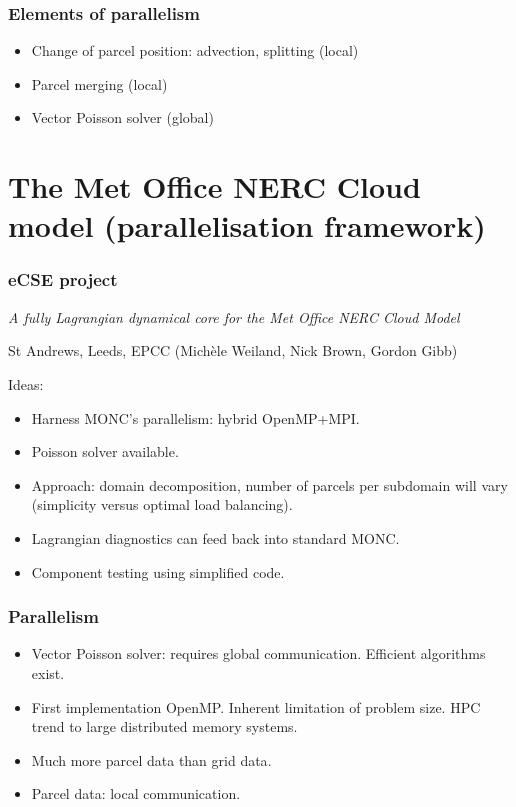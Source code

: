 \documentclass{beamer}
\def\oran#1{\color{orange} #1}
\def\gr#1{\color{dark_green} #1}
\def\re#1{\color{red}   #1}
\def\bl#1{\color{blue}  #1}
\def\pu#1{\color{purple} #1}
\begin{document}
\begin{frame}
\frametitle{Elements of parallelism}

\begin{itemize}
\item Change of parcel position: advection, splitting (local)
\item Parcel merging (local)
\item Vector Poisson solver (global)
\end{itemize}

\end{frame}

\section{The Met Office NERC Cloud model (parallelisation framework)}

\begin{frame}
\frametitle{eCSE project}
\textit{A fully Lagrangian dynamical core for the Met Office NERC Cloud Model}
\vspace{0.2cm}
\begin{center}
St Andrews, Leeds, EPCC (Mich\`ele Weiland, Nick Brown, Gordon Gibb)
\end{center}

\vspace{0.1cm}
Ideas:
\begin{itemize}
\item Harness {\gr MONC's parallelism}: hybrid OpenMP+MPI.
\item Poisson solver available.
\item Approach: {\bl domain decomposition}, number of parcels per subdomain will vary (simplicity versus optimal load balancing).
\item {\re Lagrangian diagnostics} can feed back into standard MONC.
\item {\pu Component testing} using simplified code.
\end{itemize}

\end{frame}

\begin{frame}
\frametitle{Parallelism}

\vspace{0.2cm}
\begin{itemize}
\item Vector Poisson solver: requires global communication. {\bl Efficient algorithms} exist.
\item First implementation OpenMP. Inherent limitation of problem size. HPC trend to {\pu large distributed memory systems}. 
\item Much more {\re parcel data} than {\gr grid data}.
\item Parcel data: {\oran local communication}.
\end{itemize}

\centering

\end{frame}
\end{document}
